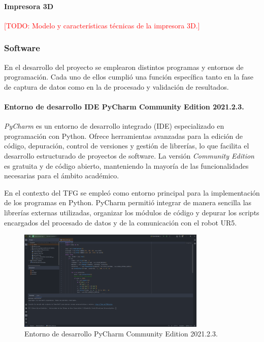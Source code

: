 \documentclass[12pt,a4paper,oneside]{report}
\newcommand{\todo}[1]{\textcolor{red}{[TODO: #1]}}
\begin{document}
\paragraph{Impresora 3D}
\todo{Modelo y características técnicas de la impresora 3D.}

\subsubsection{Software}
En el desarrollo del proyecto se emplearon distintos programas y 
entornos de programación. Cada uno de ellos cumplió una función 
específica tanto en la fase de captura de datos como en la de 
procesado y validación de resultados.

\paragraph{Entorno de desarrollo \acrshort{IDE} PyCharm Community Edition 2021.2.3.}\textit{PyCharm} es un entorno de desarrollo integrado (\acrshort{IDE}) 
especializado en programación con Python. Ofrece herramientas 
avanzadas para la edición de código, depuración, control de 
versiones y gestión de librerías, lo que facilita el desarrollo 
estructurado de proyectos de software. La versión \textit{Community 
Edition} es gratuita y de código abierto, manteniendo la mayoría 
de las funcionalidades necesarias para el ámbito académico.\cite{pycharm}

En el contexto del TFG se empleó como entorno principal para la 
implementación de los programas en Python. PyCharm permitió 
integrar de manera sencilla las librerías externas utilizadas, 
organizar los módulos de código y depurar los scripts encargados 
del procesado de datos y de la comunicación con el robot 
\acrshort{UR5}. 

\begin{figure}[H]
\centering
\includegraphics[width=0.8\textwidth]{figuras/interfazpycarm.png}
\caption{Entorno de desarrollo PyCharm Community Edition 2021.2.3.}
\label{fig:PyCharm}
\end{figure}
\end{document}
